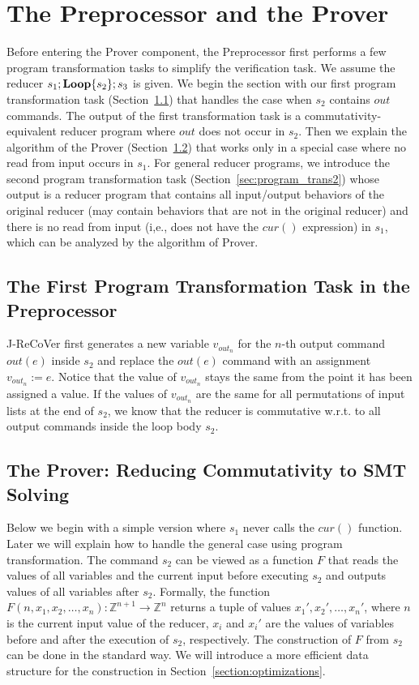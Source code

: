 \documentclass{llncs}
\newcommand{\cur}{cur()}
\newcommand{\rloop}{
	\ifmmode
	\mathbf{Loop}
	\else
	\textbf{Loop}
	\fi}
\newcommand{\Z}{\mathbb{Z}}
\begin{document}
\section{The Preprocessor and the Prover}
\label{sec:preprocessor_prover}

Before entering the Prover component, the Preprocessor first performs a few program transformation tasks to simplify the verification task.
We assume the reducer $s_1;\rloop\{s_2\};s_3$ is given. We begin the section with our first program transformation task (Section~\ref{sec:program_trans1}) that handles the case when $s_2$ contains $out$ commands. The output of the first transformation task is a commutativity-equivalent reducer program where $out$ does not occur in $s_2$.  Then we explain the algorithm of the Prover (Section~\ref{sec:prover}) that works only in a special case where no read from input occurs in $s_1$. For general reducer programs, we introduce the second program transformation task (Section~\ref{sec:program_trans2}) whose output is a reducer program that contains all input/output behaviors of the original reducer (may contain behaviors that are not in the original reducer) and there is no read from input (i,e., does not have the $\cur$ expression) in $s_1$, which can be analyzed by the algorithm of Prover.

\subsection{The First Program Transformation Task in the Preprocessor}
\label{sec:program_trans1}
J-ReCoVer  first generates a new variable $v_{out_n}$ for the $n$-th output command $out(e)$ inside $s_2$ and replace the $out(e)$ command with an assignment $v_{out_n}:=e$.
Notice that the value of $v_{out_n}$ stays the same from the point it has been assigned a value.
If the values of $v_{out_n}$ are the same for all permutations of input lists at the end of $s_2$, we know that the reducer is commutative w.r.t. to all output commands inside the loop body $s_2$.

\subsection{The Prover: Reducing Commutativity to SMT Solving}
\label{sec:prover}
Below we begin with a simple version where $s_1$ never calls the $\cur$ function. Later we will explain how to handle the general case using program transformation. The command $s_2$ can be viewed as a function $F$ that reads the values of all variables and the current input before executing $s_2$ and outputs values of all variables after $s_2$. Formally, the function $F(n,x_1,x_2,\ldots,x_n): \Z^{n+1} \rightarrow \Z^n$ returns a tuple of values $x_1',x_2',\ldots,x_n'$, where $n$ is the current input value of the reducer, $x_i$ and $x_i'$ are the values of variables before and after the execution of $s_2$, respectively. The construction of $F$ from $s_2$ can be done in the standard way. We will introduce a more efficient data structure for the construction in Section~\ref{section:optimizations}.
\end{document}
